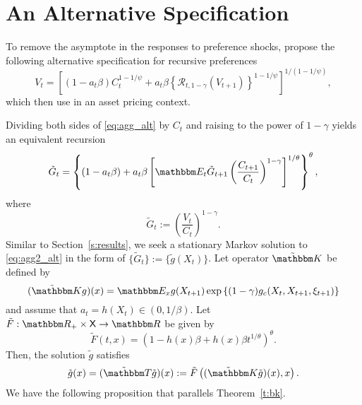 \documentclass[12pt, reqno]{amsart}
\newcommand{\1}{\mathbbm 1}
\newcommand{\rR}{\mathcal R}
\newcommand{\RR}{\mathbbm R}
\newcommand{\KK}{\mathbbm K}
\newcommand{\EE}{\mathbbm E}
\newcommand{\TT}{\mathbbm T}
\newcommand{\XX}{\mathsf X}
\theoremstyle{plain}
\theoremstyle{definition}
\begin{document}
\section{An Alternative Specification}\label{s:alt_spec}

To remove the asymptote in the responses to preference shocks,
\cite{deGroot2018} propose the following alternative specification for
recursive preferences
%
\begin{equation}
    \label{eq:agg_alt}
    V_t = \left[
            (1 -  a_t\beta) C_t^{1-1/\psi}
            + a_t\beta \left\{ \rR_{t, 1-\gamma} \left(V_{t+1}
            \right) \right\}^{1-1/\psi}
          \right]^{1/(1-1/\psi)},
\end{equation}
%
which \cite{degroot2021valuation} then use in an asset pricing context.

Dividing both sides of \eqref{eq:agg_alt} by $C_t$ and raising to the power
of $1 - \gamma$ yields an equivalent recursion
%
\begin{equation}
    \label{eq:agg2_alt}
    \tilde G_t = \left\{
        (1 - a_t\beta) + a_t\beta
        \left[
            \EE_t \tilde G_{t+1} \left(\frac{C_{t+1}}{C_t}\right)^{1-\gamma}
        \right]^{1/\theta}
        \right\}^\theta,
\end{equation}
%
where
%
\begin{equation*}
    \tilde G_t := \left( \frac{V_t}{C_t} \right)^{1-\gamma}.
\end{equation*}
%
Similar to Section~\ref{s:results}, we seek a stationary Markov solution to
\eqref{eq:agg2_alt} in the form of $\{\tilde G_t\} := \{\tilde g(X_t)\}$. Let
operator $\tilde \KK$ be defined by
%
\begin{equation*}
    (\tilde \KK g)(x) = \EE_x g(X_{t+1})
    \exp\left\{(1-\gamma) g_c(X_t, X_{t+1}, \xi_{t+1}) \right\}
\end{equation*}
%
and assume that $a_t = h(X_t) \in (0, 1/\beta)$. Let $\tilde F: \RR_+ \times
\XX \to \RR$ be given by
%
\begin{equation*}
    \tilde F(t, x) = \left(1 - h(x)\beta + h(x)\beta t^{1/\theta} \right)^\theta.
\end{equation*}
%
Then, the solution $\tilde g$ satisfies
%
\begin{equation}
    \label{eq:deft_alt}
    \tilde g(x)
    = (\tilde \TT \tilde g) (x)
    := \tilde F \left( (\tilde \KK \tilde g)(x), x \right).
\end{equation}
%
We have the following proposition that parallels Theorem~\ref{t:bk}.
\end{document}
